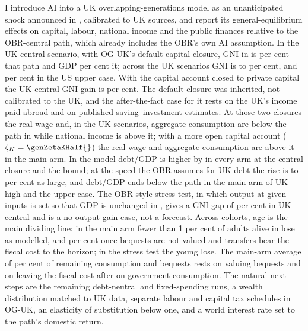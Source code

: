 I introduce AI into a UK overlapping-generations model as an unanticipated shock announced in \genShockYear{}, calibrated to UK sources, and report its general-equilibrium effects on capital, labour, national income and the public finances relative to the OBR-central path, which already includes the OBR's own AI assumption. In the UK central scenario, with OG-UK's default capital closure, GNI in \genHeadYear{} is \genUkCentralMainGniCentralAbs{} per cent \genUkCentralMainGniCentralDir{} that path and GDP \genUkCentralMainGdpCentralAbs{} per cent \genUkCentralMainGdpCentralDir{} it; across the UK scenarios GNI is \genUkLowMainGniCentralShort{} to \genUkHighMainGniCentralShort{} per cent, and \genKorinekMainGniCentralShort{} per cent in the US upper case. With the capital account closed to private capital the UK central GNI gain is \genUkCentralMainGniBoundShort{} per cent. The default closure was inherited, not calibrated to the UK, and the after-the-fact case for it rests on the UK's income paid abroad and on published saving--investment estimates. At those two closures the real wage and, in the UK scenarios, aggregate consumption are below the path in \genHeadYear{} while national income is above it; with a more open capital account ($\zetaK = \genZetaKHalf{}$) the real wage and aggregate consumption are above it in the main arm. In the model debt/GDP is higher by \genDebtRuleYear{} in every arm at the central closure and the bound; at the speed the OBR assumes for UK debt the rise is \genRepriceRatioMinPct{} to \genRepriceRatioMaxPct{} per cent as large, and debt/GDP ends below the path in the main arm of UK high and the upper case. The OBR-style stress test, in which output at given inputs is set so that GDP is unchanged in \genHeadYear{}, gives a GNI gap of \genUkCentralStressGniCentralShort{} per cent in UK central and is a no-output-gain case, not a forecast. Across cohorts, age is the main dividing line: in the main arm fewer than 1 per cent of adults alive in \genShockYear{} lose as modelled, and \genCohMainDnfullCentralNoBeqLosingPctRange{} per cent once bequests are not valued and transfers bear the fiscal cost to the horizon; in the stress test the young lose. The main-arm average of \genCohMainDnCentralAvgShort{} per cent of remaining consumption and bequests rests on valuing bequests and on leaving the fiscal cost after \genLastFlowYear{} on government consumption. The natural next steps are the remaining debt-neutral and fixed-spending runs, a wealth distribution matched to UK data, separate labour and capital tax schedules in OG-UK, an elasticity of substitution below one, and a world interest rate set to the path's domestic return.
